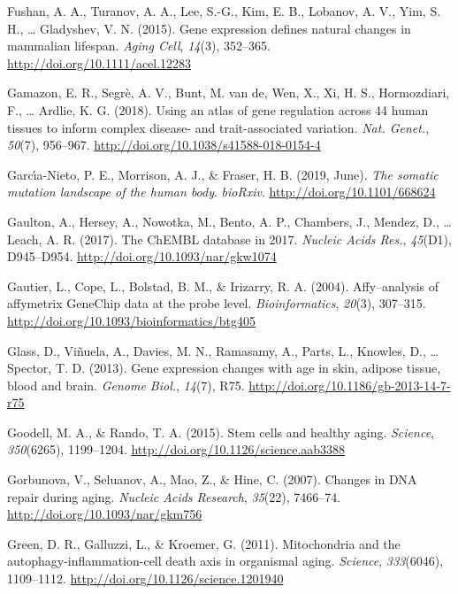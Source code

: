 \documentclass[12pt,twoside]{unicam}
\begin{document}
\begin{cslreferences}
\leavevmode\hypertarget{ref-Fushan2015}{}%
Fushan, A. A., Turanov, A. A., Lee, S.-G., Kim, E. B., Lobanov, A. V., Yim, S. H., \ldots{} Gladyshev, V. N. (2015). Gene expression defines natural changes in mammalian lifespan. \emph{Aging Cell}, \emph{14}(3), 352--365. \url{http://doi.org/10.1111/acel.12283}

\leavevmode\hypertarget{ref-Gamazon2018}{}%
Gamazon, E. R., Segrè, A. V., Bunt, M. van de, Wen, X., Xi, H. S., Hormozdiari, F., \ldots{} Ardlie, K. G. (2018). Using an atlas of gene regulation across 44 human tissues to inform complex disease- and trait-associated variation. \emph{Nat. Genet.}, \emph{50}(7), 956--967. \url{http://doi.org/10.1038/s41588-018-0154-4}

\leavevmode\hypertarget{ref-Garcia-Nieto2019}{}%
Garcı́a-Nieto, P. E., Morrison, A. J., \& Fraser, H. B. (2019, June). \emph{The somatic mutation landscape of the human body}. \emph{bioRxiv}. \url{http://doi.org/10.1101/668624}

\leavevmode\hypertarget{ref-Gaulton2017}{}%
Gaulton, A., Hersey, A., Nowotka, M., Bento, A. P., Chambers, J., Mendez, D., \ldots{} Leach, A. R. (2017). The ChEMBL database in 2017. \emph{Nucleic Acids Res.}, \emph{45}(D1), D945--D954. \url{http://doi.org/10.1093/nar/gkw1074}

\leavevmode\hypertarget{ref-Gautier2004}{}%
Gautier, L., Cope, L., Bolstad, B. M., \& Irizarry, R. A. (2004). Affy--analysis of affymetrix GeneChip data at the probe level. \emph{Bioinformatics}, \emph{20}(3), 307--315. \url{http://doi.org/10.1093/bioinformatics/btg405}

\leavevmode\hypertarget{ref-Glass2013}{}%
Glass, D., Viñuela, A., Davies, M. N., Ramasamy, A., Parts, L., Knowles, D., \ldots{} Spector, T. D. (2013). Gene expression changes with age in skin, adipose tissue, blood and brain. \emph{Genome Biol.}, \emph{14}(7), R75. \url{http://doi.org/10.1186/gb-2013-14-7-r75}

\leavevmode\hypertarget{ref-Goodell2015}{}%
Goodell, M. A., \& Rando, T. A. (2015). Stem cells and healthy aging. \emph{Science}, \emph{350}(6265), 1199--1204. \url{http://doi.org/10.1126/science.aab3388}

\leavevmode\hypertarget{ref-Gorbunova2007}{}%
Gorbunova, V., Seluanov, A., Mao, Z., \& Hine, C. (2007). Changes in DNA repair during aging. \emph{Nucleic Acids Research}, \emph{35}(22), 7466--74. \url{http://doi.org/10.1093/nar/gkm756}

\leavevmode\hypertarget{ref-Green2011}{}%
Green, D. R., Galluzzi, L., \& Kroemer, G. (2011). Mitochondria and the autophagy-inflammation-cell death axis in organismal aging. \emph{Science}, \emph{333}(6046), 1109--1112. \url{http://doi.org/10.1126/science.1201940}


\end{cslreferences}
\end{document}
